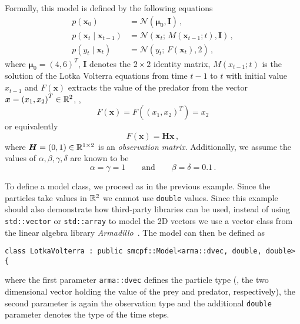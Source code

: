 \begin{example}
  Formally, this model is defined by the following equations
  \begin{equation}
    \label{eq:lv}
    \begin{aligned}
      p(\bm{x}_0) &= \mathcal{N}(\bm{\mu}_0, \bm{I})\,, \\
      p(\bm{x}_t \mid \bm{x}_{t-1}) &= \mathcal{N}(\bm{x}_t;\, M(\bm{x}_{t-1}; t), \bm{I})\,, \\
      p(y_t \mid \bm{x}_t) &= \mathcal{N}(y_t;\, F(\bm{x}_{t}), 2) \,,
    \end{aligned}
  \end{equation}
  where $\bm{\mu}_0 = {(4, 6)}^T$, $\bm{I}$ denotes the $2 \times 2$
  identity matrix, $M(x_{t-1}; t)$ is the solution of the Lotka
  Volterra equations from time $t-1$ to $t$ with initial value
  $x_{t-1}$ and $F(\bm{x})$ extracts the value of the predator from
  the vector $\bm{x} = {(x_1, x_2)}^T \in \mathbb{R}^2$, \ie,
  \begin{equation}
    \label{eq:lv1:obs}
    F(\bm{x}) = F({(x_1, x_2)}^T) = x_2
  \end{equation}
  or equivalently
  \begin{equation}
    \label{eq:lv1:obs2}
    F(\bm{x}) = \bm{H} \bm{x}\,,
  \end{equation}
  where $\bm{H} = (0, 1) \in \mathbb{R}^{1 \times 2}$ is an \emph{observation
    matrix}. Additionally, we assume the values of
  $\alpha, \beta, \gamma, \delta$ are known to be
  \[
    \alpha = \gamma = 1 \qquad \text{and} \qquad \beta = \delta =
    0.1\,.
  \]

  To define a model class, we proceed as in the previous
  example. Since the particles take values in $\mathbb{R}^2$ we cannot use
  \texttt{double} values. Since this example should also demonstrate
  how third-party libraries can be used, instead of using
  \texttt{std::vector} or \texttt{std::array} to model the 2D vectors
  we use a vector class from the linear algebra library
  \emph{Armadillo}~\cite{armadillo}. The model can then be defined as
\begin{verbatim}
class LotkaVolterra : public smcpf::Model<arma::dvec, double, double> {
\end{verbatim}
  where the first parameter \texttt{arma::dvec} defines the particle
  type (\ie, the two dimensional vector holding the value of the prey
  and predator, respectively), the second parameter is again the
  observation type and the additional \texttt{double} parameter
  denotes the type of the time steps.


\end{example}
